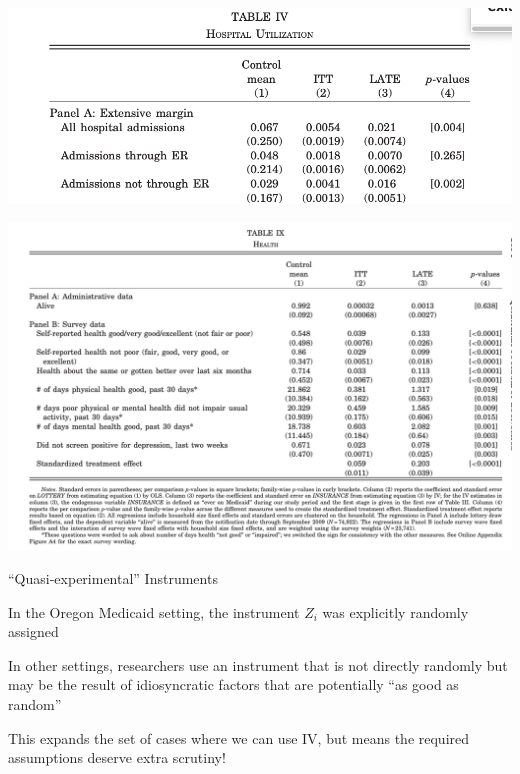\documentclass[11pt,english,handout]{beamer}
\newenvironment{wideitemize}{\itemize\addtolength{\itemsep}{10pt}}{\enditemize}
\begin{document}
\begin{frame}
	\includegraphics[width = 0.9\linewidth]{finkelstein-results-er}
\end{frame}


\begin{frame}
	\includegraphics[width = 0.9\linewidth]{finkelstein-results-depression}
\end{frame}


\begin{frame}{``Quasi-experimental'' Instruments}
	
	\begin{wideitemize}
		\item
		In the Oregon Medicaid setting, the instrument $Z_i$ was explicitly randomly assigned
		
		\pause
		\item
		In other settings, researchers use an instrument that is not directly randomly but may be the result of idiosyncratic factors that are potentially ``as good as random''
		
		\item
		This expands the set of cases where we can use IV, but means the required assumptions deserve extra scrutiny! 
	\end{wideitemize}
\end{frame}
\end{document}
